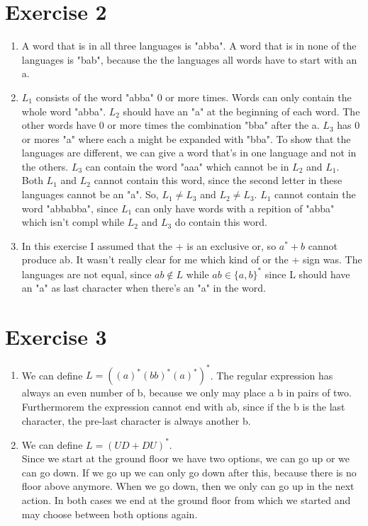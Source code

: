 \documentclass{article}
\begin{document}
\section*{Exercise 2}
\begin{enumerate}[label=\alph*]
  \item A word that is in all three languages is "abba". A word that is in none of the languages is "bab", because the the languages all words have to start with an a.
  \item $L_1$ consists of the word "abba" 0 or more times. Words can only contain the whole word "abba". $L_2$ should have an "a" at the beginning of each word. The other words have 0 or more times the combination "bba" after the a. $L_3$ has 0 or mores "a" where each a might be expanded with "bba". To show that the languages are different, we can give a word that's in one language and not in the others. $L_3$ can contain the word "aaa" which cannot be in $L_2$ and $L_1$. Both $L_1$ and $L_2$ cannot contain this word, since the second letter in these languages cannot be an "a". So, $L_1 \neq L_3$ and $L_2 \neq L_3$. $L_1$ cannot contain the word "abbabba", since $L_1$ can only have words with a repition of "abba" which isn't compl while $L_2$ and $L_3$ do contain this word.
  \item In this exercise I assumed that the + is an exclusive or, so $a^* + b$ cannot produce ab. It wasn't really clear for me which kind of or the + sign was. The languages are not equal, since $ab \notin L$ while $ab \in \{a,  b\}^*$ since L should have an "a" as last character when there's an "a" in the word.
\end{enumerate}

\section*{Exercise 3}
\begin{enumerate}[label=\alph*]
  \item We can define $L = ((a)^* (bb)^* (a)^*)^*$. The regular expression has always an even number of b, because we only may place a b in pairs of two. Furthermorem the expression cannot end with ab, since if the b is the last character, the pre-last character is always another b.
  \item
  We can define $L = (UD + DU)^*$. \\
  Since we start at the ground floor we have two options, we can go up or we can go down. If we go up we can only go down after this, because there is no floor above anymore. When we go down, then we only can go up in the next action. In both cases we end at the ground floor from which we started and may choose between both options again.
\end{enumerate}
\end{document}
